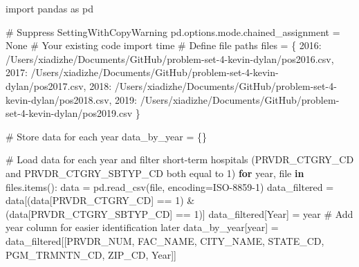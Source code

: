 \documentclass[
  letterpaper,
  DIV=11,
  numbers=noendperiod]{scrartcl}
\newenvironment{Shaded}{\begin{snugshade}}{\end{snugshade}}
\newcommand{\BuiltInTok}[1]{\textcolor[rgb]{0.00,0.23,0.31}{#1}}
\newcommand{\CommentTok}[1]{\textcolor[rgb]{0.37,0.37,0.37}{#1}}
\newcommand{\ControlFlowTok}[1]{\textcolor[rgb]{0.00,0.23,0.31}{\textbf{#1}}}
\newcommand{\DecValTok}[1]{\textcolor[rgb]{0.68,0.00,0.00}{#1}}
\newcommand{\ImportTok}[1]{\textcolor[rgb]{0.00,0.46,0.62}{#1}}
\newcommand{\KeywordTok}[1]{\textcolor[rgb]{0.00,0.23,0.31}{\textbf{#1}}}
\newcommand{\NormalTok}[1]{\textcolor[rgb]{0.00,0.23,0.31}{#1}}
\newcommand{\OperatorTok}[1]{\textcolor[rgb]{0.37,0.37,0.37}{#1}}
\newcommand{\StringTok}[1]{\textcolor[rgb]{0.13,0.47,0.30}{#1}}
\newcommand{\VariableTok}[1]{\textcolor[rgb]{0.07,0.07,0.07}{#1}}
\begin{document}
\begin{Shaded}
\begin{Highlighting}[]
\ImportTok{import}\NormalTok{ pandas }\ImportTok{as}\NormalTok{ pd}

\CommentTok{\# Suppress SettingWithCopyWarning}
\NormalTok{pd.options.mode.chained\_assignment }\OperatorTok{=} \VariableTok{None}
\CommentTok{\# Your existing code}
\ImportTok{import}\NormalTok{ time}
\CommentTok{\# Define file paths}
\NormalTok{files }\OperatorTok{=}\NormalTok{ \{}
    \DecValTok{2016}\NormalTok{: }\StringTok{\textquotesingle{}/Users/xiadizhe/Documents/GitHub/problem{-}set{-}4{-}kevin{-}dylan/pos2016.csv\textquotesingle{}}\NormalTok{,}
    \DecValTok{2017}\NormalTok{: }\StringTok{\textquotesingle{}/Users/xiadizhe/Documents/GitHub/problem{-}set{-}4{-}kevin{-}dylan/pos2017.csv\textquotesingle{}}\NormalTok{,}
    \DecValTok{2018}\NormalTok{: }\StringTok{\textquotesingle{}/Users/xiadizhe/Documents/GitHub/problem{-}set{-}4{-}kevin{-}dylan/pos2018.csv\textquotesingle{}}\NormalTok{,}
    \DecValTok{2019}\NormalTok{: }\StringTok{\textquotesingle{}/Users/xiadizhe/Documents/GitHub/problem{-}set{-}4{-}kevin{-}dylan/pos2019.csv\textquotesingle{}}
\NormalTok{\}}

\CommentTok{\# Store data for each year}
\NormalTok{data\_by\_year }\OperatorTok{=}\NormalTok{ \{\}}

\CommentTok{\# Load data for each year and filter short{-}term hospitals (PRVDR\_CTGRY\_CD and PRVDR\_CTGRY\_SBTYP\_CD both equal to 1)}
\ControlFlowTok{for}\NormalTok{ year, }\BuiltInTok{file} \KeywordTok{in}\NormalTok{ files.items():}
\NormalTok{    data }\OperatorTok{=}\NormalTok{ pd.read\_csv(}\BuiltInTok{file}\NormalTok{, encoding}\OperatorTok{=}\StringTok{\textquotesingle{}ISO{-}8859{-}1\textquotesingle{}}\NormalTok{)}
\NormalTok{    data\_filtered }\OperatorTok{=}\NormalTok{ data[(data[}\StringTok{\textquotesingle{}PRVDR\_CTGRY\_CD\textquotesingle{}}\NormalTok{] }\OperatorTok{==} \DecValTok{1}\NormalTok{) }\OperatorTok{\&}\NormalTok{ (data[}\StringTok{\textquotesingle{}PRVDR\_CTGRY\_SBTYP\_CD\textquotesingle{}}\NormalTok{] }\OperatorTok{==} \DecValTok{1}\NormalTok{)]}
\NormalTok{    data\_filtered[}\StringTok{\textquotesingle{}Year\textquotesingle{}}\NormalTok{] }\OperatorTok{=}\NormalTok{ year  }\CommentTok{\# Add year column for easier identification later}
\NormalTok{    data\_by\_year[year] }\OperatorTok{=}\NormalTok{ data\_filtered[[}\StringTok{\textquotesingle{}PRVDR\_NUM\textquotesingle{}}\NormalTok{, }\StringTok{\textquotesingle{}FAC\_NAME\textquotesingle{}}\NormalTok{, }\StringTok{\textquotesingle{}CITY\_NAME\textquotesingle{}}\NormalTok{, }\StringTok{\textquotesingle{}STATE\_CD\textquotesingle{}}\NormalTok{, }\StringTok{\textquotesingle{}PGM\_TRMNTN\_CD\textquotesingle{}}\NormalTok{, }\StringTok{\textquotesingle{}ZIP\_CD\textquotesingle{}}\NormalTok{, }\StringTok{\textquotesingle{}Year\textquotesingle{}}\NormalTok{]]}


\end{Highlighting}
\end{Shaded}
\end{document}
